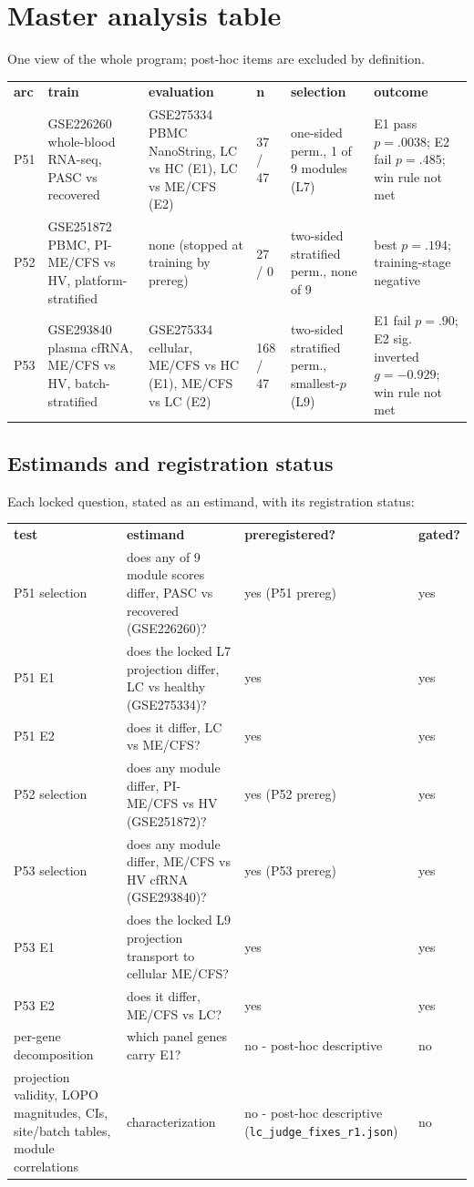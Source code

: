 \documentclass[11pt,a4paper]{article}
\begin{document}
\section{Master analysis table}
\label{sec:master}
One view of the whole program; post-hoc items are excluded by definition.

\begin{longtable}{llllll}
\textbf{arc} & \textbf{train} & \textbf{evaluation} & \textbf{n} & \textbf{selection} & \textbf{outcome}\\
P51 & GSE226260 whole-blood RNA-seq, PASC vs recovered & GSE275334 PBMC NanoString, LC vs HC (E1), LC vs ME/CFS (E2) & 37 / 47 & one-sided perm., 1 of 9 modules (L7) & E1 pass $p=.0038$; E2 fail $p=.485$; win rule not met\\
P52 & GSE251872 PBMC, PI-ME/CFS vs HV, platform-stratified & none (stopped at training by prereg) & 27 / 0 & two-sided stratified perm., none of 9 & best $p=.194$; training-stage negative\\
P53 & GSE293840 plasma cfRNA, ME/CFS vs HV, batch-stratified & GSE275334 cellular, ME/CFS vs HC (E1), ME/CFS vs LC (E2) & 168 / 47 & two-sided stratified perm., smallest-$p$ (L9) & E1 fail $p=.90$; E2 sig. inverted $g=-0.929$; win rule not met\\
\end{longtable}

\subsection{Estimands and registration status}
Each locked question, stated as an estimand, with its registration status:

\begin{longtable}{llll}
\textbf{test} & \textbf{estimand} & \textbf{preregistered?} & \textbf{gated?}\\
P51 selection & does any of 9 module scores differ, PASC vs recovered (GSE226260)? & yes (P51 prereg) & yes\\
P51 E1 & does the locked L7 projection differ, LC vs healthy (GSE275334)? & yes & yes\\
P51 E2 & does it differ, LC vs ME/CFS? & yes & yes\\
P52 selection & does any module differ, PI-ME/CFS vs HV (GSE251872)? & yes (P52 prereg) & yes\\
P53 selection & does any module differ, ME/CFS vs HV cfRNA (GSE293840)? & yes (P53 prereg) & yes\\
P53 E1 & does the locked L9 projection transport to cellular ME/CFS? & yes & yes\\
P53 E2 & does it differ, ME/CFS vs LC? & yes & yes\\
per-gene decomposition & which panel genes carry E1? & no - post-hoc descriptive & no\\
projection validity, LOPO magnitudes, CIs, site/batch tables, module correlations & characterization & no - post-hoc descriptive (\texttt{lc\_judge\_fixes\_r1.json}) & no\\
\end{longtable}
\end{document}
